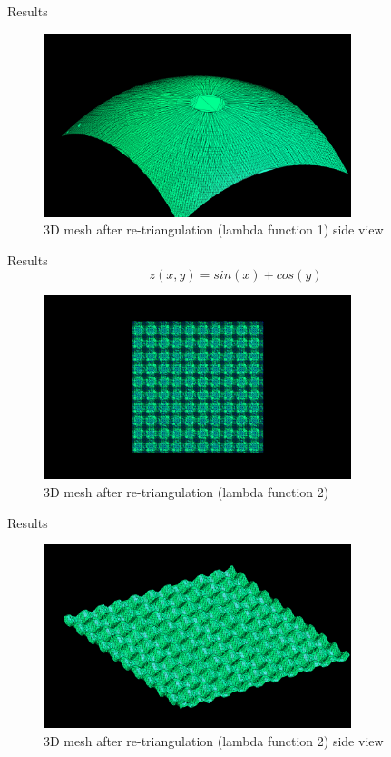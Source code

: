 \documentclass[10pt]{beamer}
\begin{document}
\begin{frame}{Results}
  \begin{figure}[H]
    \centering
    \includegraphics[width=0.8\textwidth]{images/constrained-lambda-1-side.png}
    \caption{3D mesh after re-triangulation (lambda function 1) side view}
\end{figure}
\end{frame}

\begin{frame}{Results}
  \Large
  \[
  z(x, y) = sin(x) + cos(y)
  \]
  \begin{figure}[H]
    \centering
    \includegraphics[width=0.8\textwidth]{images/constrained-lambda-2.png}
    \caption{3D mesh after re-triangulation (lambda function 2)}
\end{figure}
\end{frame}

\begin{frame}{Results}
  \begin{figure}[H]
    \centering
    \includegraphics[width=0.8\textwidth]{images/constrained-lambda-2-side.png}
    \caption{3D mesh after re-triangulation (lambda function 2) side view}
\end{figure}
\end{frame}
\end{document}
